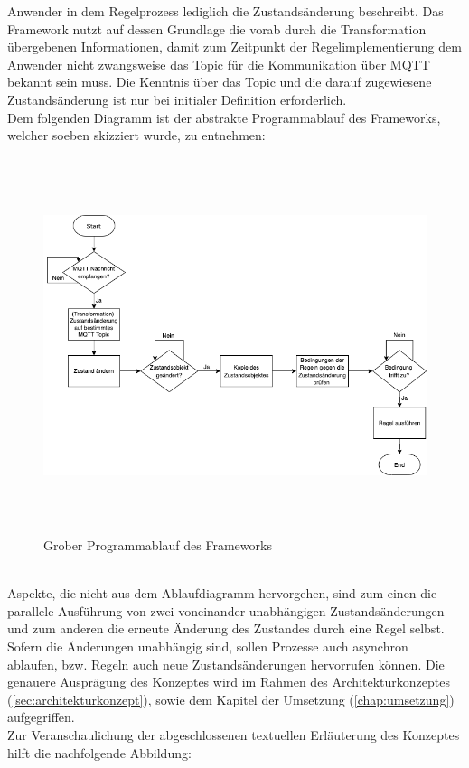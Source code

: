         Anwender in dem Regelprozess lediglich die Zustandsänderung beschreibt. Das Framework nutzt auf dessen Grundlage die vorab durch die Transformation 
        übergebenen Informationen, damit zum Zeitpunkt der Regelimplementierung dem Anwender nicht zwangsweise das Topic für die Kommunikation über \acs{MQTT} 
        bekannt sein muss. Die Kenntnis über das Topic und die darauf zugewiesene Zustandsänderung ist nur bei initialer Definition erforderlich. 
        \pagebreak
        \\
        \linebreak
        Dem folgenden Diagramm ist der abstrakte Programmablauf des Frameworks, welcher soeben skizziert wurde, zu entnehmen:
        \begin{figure}[hbt!]
            \centering
            \includegraphics[width=14cm,height=11cm,keepaspectratio]{images/Programmablauf_Framework.png}
            \caption{Grober Programmablauf des Frameworks}
            \label{fig:programmablauf_framework}
        \end{figure}
        \\
        Aspekte, die nicht aus dem Ablaufdiagramm hervorgehen, sind zum einen die parallele Ausführung von zwei voneinander unabhängigen 
        Zustandsänderungen und zum anderen die erneute Änderung des Zustandes durch eine Regel selbst. Sofern die Änderungen unabhängig 
        sind, sollen Prozesse auch asynchron ablaufen, bzw. Regeln auch neue Zustandsänderungen hervorrufen können. Die genauere Ausprägung des 
        Konzeptes wird im Rahmen des Architekturkonzeptes (\ref{sec:architekturkonzept}), sowie dem Kapitel der Umsetzung 
        (\ref{chap:umsetzung}) aufgegriffen. 
        \\
        \linebreak
        Zur Veranschaulichung der abgeschlossenen textuellen Erläuterung des Konzeptes hilft die nachfolgende Abbildung: 
        